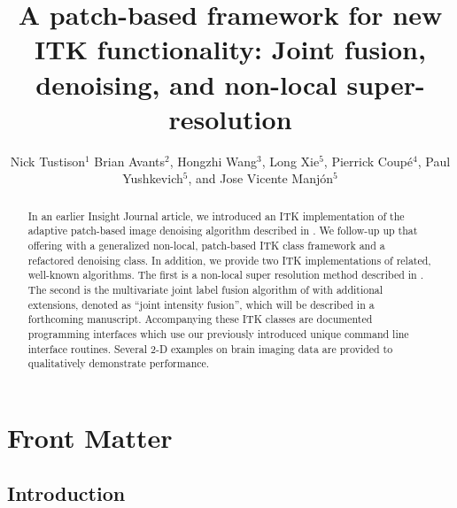 \documentclass{InsightArticle}
\title{A patch-based framework for new ITK functionality:  Joint fusion, denoising,
and non-local super-resolution}
\author{Nick Tustison$^{1}$
        Brian Avants$^{2}$,
        Hongzhi Wang$^{3}$,
        Long Xie$^{5}$,
        Pierrick Coup\'e$^{4}$,
        Paul Yushkevich$^{5}$, and
        Jose Vicente Manj\'on$^{5}$}
\newcommand{\IJhandlerIDnumber}{}
\begin{document}
%
%
\IJhandlefooter{\IJhandlerIDnumber}




\maketitle


\ifhtml
\chapter*{Front Matter\label{front}}
\fi


\begin{abstract}
\noindent
In an earlier Insight Journal article, we introduced an ITK implementation of the
adaptive patch-based image denoising algorithm described in \cite{Manjon:2010aa}.
We follow-up up that offering with a generalized non-local, patch-based ITK class
framework and a refactored denoising class.  In addition, we provide two
ITK implementations of related, well-known algorithms.  The first is a non-local
super resolution method described in \cite{Manjon:2010ab,Manjon:2010ac}.  The second is
the multivariate
joint label fusion algorithm of \cite{Wang:2013ab,Wang:2013aa} with additional extensions,
denoted as ``joint intensity fusion'', which will be described in a forthcoming manuscript.
Accompanying these ITK classes are
documented programming interfaces which use our previously introduced unique
command line interface routines.  Several 2-D examples on brain imaging data are
provided to qualitatively demonstrate performance.
\end{abstract}

\IJhandlenote{\IJhandlerIDnumber}


\section{Introduction}
\end{document}

